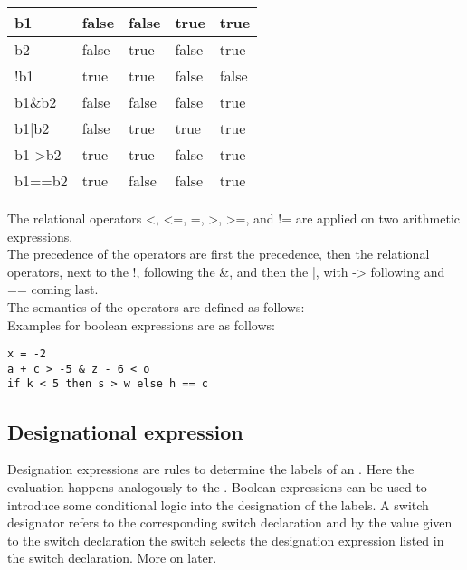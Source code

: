 \documentclass{article}
\begin{document}
\begin{table}[h]
	\begin{tabular}{|l|l|l|l|l|}
		\hline
		b1                  & false & false & true  & true  \\ \hline
		b2                  & false & true  & false & true  \\ \hline
		!b1                 & true  & true  & false & false \\ \hline
		b1\&b2              & false & false & false & true  \\ \hline
		b1|b2               & false & true  & true  & true  \\ \hline
		b1-\textgreater{}b2 & true  & true  & false & true  \\ \hline
		b1==b2              & true  & false & false & true  \\ \hline
	\end{tabular}
\end{table}

The relational operators <, <=, =, >, >=, and != are applied on two arithmetic expressions. \\
The precedence of the operators are first the \label{arithexptypes} precedence, then the relational operators, next to the !, following the \&, and then the |, with -\textgreater{} following and == coming last.\\
The semantics of the operators are defined as follows:\\

Examples for boolean expressions are as follows:\\

\begin{lstlisting}[language={[60]algol}]
x = -2
a + c > -5 & z - 6 < o
if k < 5 then s > w else h == c
\end{lstlisting}

\subsection{Designational expression} \label{desigExp}
Designation expressions are rules to determine the labels of an . Here the evaluation happens analogously to the . Boolean expressions can be used to introduce some conditional logic into the designation of the labels. A switch designator refers to the corresponding switch declaration and by the value given to the switch declaration the switch selects the designation expression listed in the switch declaration. More on  later.\\
\end{document}
